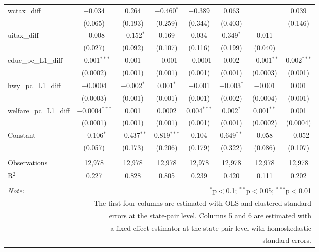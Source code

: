 \begin{table}[!htbp]
\begin{tabular}{@{\extracolsep{5pt}}lccccccc}
  wctax\_diff & $-$0.034 & 0.264 & $-$0.460$^{*}$ & $-$0.389 & 0.063 &  & 0.039 \\ 
  & (0.065) & (0.193) & (0.259) & (0.344) & (0.403) &  & (0.146) \\ 
  uitax\_diff & $-$0.008 & $-$0.152$^{*}$ & 0.169 & 0.034 & 0.349$^{*}$ & 0.011 &  \\ 
  & (0.027) & (0.092) & (0.107) & (0.116) & (0.199) & (0.040) &  \\ 
  educ\_pc\_L1\_diff & $-$0.001$^{***}$ & 0.001 & $-$0.001 & $-$0.0001 & 0.002 & $-$0.001$^{**}$ & 0.002$^{***}$ \\ 
  & (0.0002) & (0.001) & (0.001) & (0.001) & (0.001) & (0.0003) & (0.001) \\ 
  hwy\_pc\_L1\_diff & $-$0.0004 & $-$0.002$^{*}$ & 0.001$^{*}$ & $-$0.001 & $-$0.003$^{*}$ & $-$0.001 & 0.001 \\ 
  & (0.0003) & (0.001) & (0.001) & (0.001) & (0.002) & (0.0004) & (0.001) \\ 
  welfare\_pc\_L1\_diff & $-$0.0004$^{***}$ & 0.001 & 0.0002 & 0.004$^{***}$ & 0.002$^{*}$ & 0.001$^{**}$ & 0.001 \\ 
  & (0.0001) & (0.001) & (0.001) & (0.001) & (0.001) & (0.0002) & (0.0004) \\ 
  Constant & $-$0.106$^{*}$ & $-$0.437$^{**}$ & 0.819$^{***}$ & 0.104 & 0.649$^{**}$ & 0.058 & $-$0.052 \\ 
  & (0.057) & (0.173) & (0.206) & (0.179) & (0.322) & (0.086) & (0.107) \\ 
 \hline \\[-1.8ex] 
Observations & 12,978 & 12,978 & 12,978 & 12,978 & 12,978 & 12,978 & 12,978 \\ 
R$^{2}$ & 0.227 & 0.828 & 0.805 & 0.239 & 0.420 & 0.111 & 0.202 \\ 
\hline 
\hline \\[-1.8ex] 
\textit{Note:}  & \multicolumn{7}{r}{$^{*}$p$<$0.1; $^{**}$p$<$0.05; $^{***}$p$<$0.01} \\ 
 & \multicolumn{7}{r}{The first four columns are estimated with OLS and clustered standard} \\ 
 & \multicolumn{7}{r}{ errors at the state-pair level. Columns 5 and 6 are estimated with} \\ 
 & \multicolumn{7}{r}{a fixed effect estimator at the state-pair level with homoskedastic} \\ 
 & \multicolumn{7}{r}{standard errors.} \\ 
\end{tabular} 
\end{table} 
